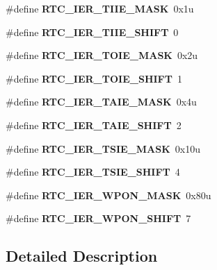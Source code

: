 \begin{DoxyCompactItemize}
$$\#define {\bfseries R\+T\+C\+\_\+\+I\+E\+R\+\_\+\+T\+I\+I\+E\+\_\+\+M\+A\+SK}~0x1u
\item 
\mbox{\label{group___r_t_c___register___masks_ga2938c56e7566549f7434b8f02ad6d478}} 
\#define {\bfseries R\+T\+C\+\_\+\+I\+E\+R\+\_\+\+T\+I\+I\+E\+\_\+\+S\+H\+I\+FT}~0
\item 
\mbox{\label{group___r_t_c___register___masks_ga1dfc25308bec00f67925ae796f805d3d}} 
\#define {\bfseries R\+T\+C\+\_\+\+I\+E\+R\+\_\+\+T\+O\+I\+E\+\_\+\+M\+A\+SK}~0x2u
\item 
\mbox{\label{group___r_t_c___register___masks_gaf9355764ec83dde6e2890f391a469856}} 
\#define {\bfseries R\+T\+C\+\_\+\+I\+E\+R\+\_\+\+T\+O\+I\+E\+\_\+\+S\+H\+I\+FT}~1
\item 
\mbox{\label{group___r_t_c___register___masks_gad1bcc4df9a637ec5ab4b611391986c06}} 
\#define {\bfseries R\+T\+C\+\_\+\+I\+E\+R\+\_\+\+T\+A\+I\+E\+\_\+\+M\+A\+SK}~0x4u
\item 
\mbox{\label{group___r_t_c___register___masks_gae15cd7098592da4c3a2c2563879ae5d8}} 
\#define {\bfseries R\+T\+C\+\_\+\+I\+E\+R\+\_\+\+T\+A\+I\+E\+\_\+\+S\+H\+I\+FT}~2
\item 
\mbox{\label{group___r_t_c___register___masks_ga63c8ae5db82845d5bb13907cd0e70cd7}} 
\#define {\bfseries R\+T\+C\+\_\+\+I\+E\+R\+\_\+\+T\+S\+I\+E\+\_\+\+M\+A\+SK}~0x10u
\item 
\mbox{\label{group___r_t_c___register___masks_ga456ec6fb31112c122b38dcc586d9e75d}} 
\#define {\bfseries R\+T\+C\+\_\+\+I\+E\+R\+\_\+\+T\+S\+I\+E\+\_\+\+S\+H\+I\+FT}~4
\item 
\mbox{\label{group___r_t_c___register___masks_gae08d5bcb3d71bb932a7c1d41086b3545}} 
\#define {\bfseries R\+T\+C\+\_\+\+I\+E\+R\+\_\+\+W\+P\+O\+N\+\_\+\+M\+A\+SK}~0x80u
\item 
\mbox{\label{group___r_t_c___register___masks_gaa18422218526a3bb50a3158c3aee2100}} 
\#define {\bfseries R\+T\+C\+\_\+\+I\+E\+R\+\_\+\+W\+P\+O\+N\+\_\+\+S\+H\+I\+FT}~7
\end{DoxyCompactItemize}


\subsection{Detailed Description}
